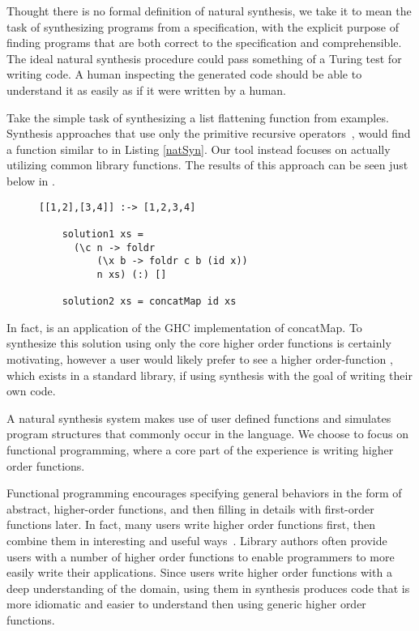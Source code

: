 Thought there is no formal definition of natural synthesis, we take it to mean the task of synthesizing programs from a specification, with the explicit purpose of finding programs that are both correct to the specification and comprehensible. The ideal natural synthesis procedure could pass something of a Turing test for writing code. A human inspecting the generated code should be able to understand it as easily as if it were written by a human.

Take the simple task of synthesizing a list flattening function from examples.  Synthesis approaches that use only the primitive recursive operators~\cite{Osera:2015,FeserCD15}, would find a function similar to  in Listing \ref{natSyn}. Our tool instead focuses on actually utilizing common library functions. The results of this approach can be seen just below in .

\begin{figure}
  \begin{lstlisting}[caption=Low-level synthesis vs. Natural synthesis,label=natSyn]
    [[1,2],[3,4]] :-> [1,2,3,4]
    
    solution1 xs = 
      (\c n -> foldr 
          (\x b -> foldr c b (id x))
          n xs) (:) []
          
    solution2 xs = concatMap id xs
    \end{lstlisting}
\end{figure}

\noindent In fact,  is an application of the GHC\cite{ghc} implementation of concatMap. To synthesize this solution using only the core higher order functions is certainly motivating, however a user would likely prefer to see a higher order-function , which exists in a standard library, if using synthesis with the goal of writing their own code.

A natural synthesis system makes use of user defined functions and simulates program structures that commonly occur in the language. We choose to focus on functional programming, where a core part of the experience is writing higher order functions.  

Functional programming encourages specifying general behaviors in the form of abstract, higher-order functions, and then filling in details with first-order functions later. In fact, many users write higher order functions first, then combine them in interesting and useful ways~\cite{Lipovaca:2011}. Library authors often provide users with a number of higher order functions to enable programmers to more easily write their applications. Since users write higher order functions with a deep understanding of the domain, using them in synthesis produces code that is more idiomatic and easier to understand then using generic higher order functions.

